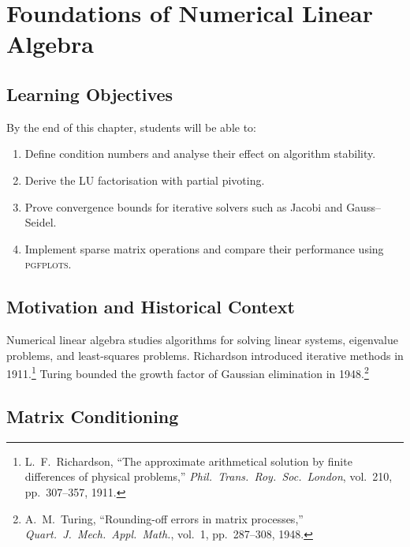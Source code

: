 \documentclass[
    language=english,
    doctype=lecture-notes,
    institution=none,
]{../../omnilatex}
\begin{document}
\maketitle

\chapter{Foundations of Numerical Linear Algebra}

\section*{Learning Objectives}
By the end of this chapter, students will be able to:
\begin{enumerate}[label=\textbf{LO\arabic*.}, leftmargin=3em]
    \item Define condition numbers and analyse their effect on algorithm stability.
    \item Derive the LU factorisation with partial pivoting.
    \item Prove convergence bounds for iterative solvers such as Jacobi and Gauss--Seidel.
    \item Implement sparse matrix operations and compare their performance using \textsc{pgfplots}.
\end{enumerate}

\section{Motivation and Historical Context}

Numerical linear algebra studies algorithms for solving linear systems,
eigenvalue problems, and least-squares problems. Richardson introduced
iterative methods in 1911.\footnote{L.~F.~Richardson, ``The approximate
arithmetical solution by finite differences of physical problems,''
\emph{Phil.\ Trans.\ Roy.\ Soc.\ London}, vol.~210, pp.~307--357, 1911.}
Turing bounded the growth factor of Gaussian elimination in 1948.\footnote{A.~M.~Turing, ``Rounding-off errors in matrix processes,''
\emph{Quart.\ J.\ Mech.\ Appl.\ Math.}, vol.~1, pp.~287--308, 1948.}

\section{Matrix Conditioning}
\end{document}
